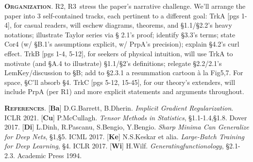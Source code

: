 \documentclass[12pt]{colt2021} %
\newcommand{\Ra}{\textmd{\textsf{\color{purple!50} {R1}}}}
\newcommand{\Rb}{\textmd{\textsf{\color{green!60}  {R2}}}}
\newcommand{\Rc}{\textmd{\textsf{\color{blue!50}   {R3}}}}
\newcommand{\cor}[1]{\textmd{{\color{gray}Cor}{#1}}}
\newcommand{\fig}[1]{\textmd{{\color{gray}Fig}#1}}
\newcommand{\lem}[1]{\textmd{{\color{gray}Lem}{#1}}}
\newcommand{\prp}[1]{\textmd{{\color{gray}Prp}{#1}}}
\newcommand{\trk}[1]{\textmd{{\color{gray}Trk}{#1}}}
\newcommand{\cit}[1]{[\textbf{#1}]}
\newcommand{\moosect}[1]{\par\noindent\hspace{-1cm}\textsc{\textbf{#1}}.}
\begin{document}
\moosect{Organization}
    \Rb,\Rc\ stress the paper's narrative challenge.  We'll arrange the paper
    into $3$ self-contained tracks, each pertinent to a different goal: 
    \trk{A} [pgs 1-4], for casual readers, will
    eschew diagrams, theorems, and \S1.1/\S2.2's heavy notations; illustrate Taylor series via \S
    2.1's proof; identify \S{3.3}'s terms; state \cor{4}
    (w/ \S B.1's assumptions explicit, w/ \prp{A}'s precision);
    explain \S 4.2's curl effect.
    \trk{B} [pgs 1-4, 5-12], for seekers of physical intuition, will use
    \trk{A} to motivate (and \S A.4 to illustrate) \S1.1/\S2's definitions;
    relegate \S2.2/2.1's \lem{Key}/discussion to \S{B}; add to \S2.3.1 a resummation cartoon \`a la 
    \fig{5,7}.
    For space, \S{C}'ll absorb \S{4}.
    \trk{C} [pgs 5-12, 15-45], for our theory's extenders, will include
    \prp{A} (per \Ra) and more explicit statements and arguments throughout.  

\moosect{References}
    \small%
    \cit{Ba} D.G.Barrett, B.Dherin.  \emph{Implicit Gradient Regularization}.  ICLR 2021.
    \cit{Cu} P.McCullagh.  \emph{Tensor Methods in Statistics}, \S{1.1-1.4},\S{1.8}.  Dover 2017.
    \cit{Di} L.Dinh, R.Pascanu, S.Bengio, Y.Bengio.  \emph{Sharp Minima Can Generalize for Deep Nets}, \S{1},\S{5}.  ICML 2017.
    \cit{Ke} N.S.Keskar et alia.  \emph{Large-Batch Training for Deep Learning}, \S{4}.  ICLR 2017.
    \cit{Wi} H.Wilf.  \emph{Generatingfunctionology}, \S{2.1-2.3}.  Academic Press 1994.
\end{document}
